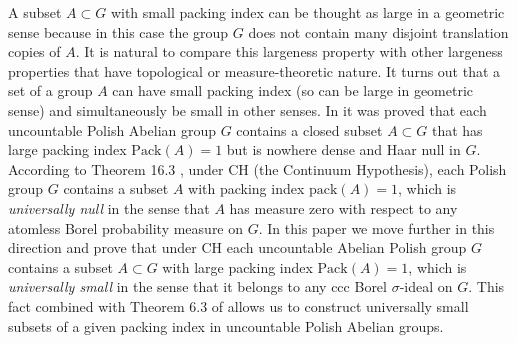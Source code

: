 \documentclass[11pt]{amsart}
\begin{document}
A subset $A\subset G$ with small packing index can be thought as large in a geometric sense because in this case the group $G$ does not contain many disjoint translation copies of $A$. It is natural to compare this largeness property with other largeness properties that have topological or measure-theoretic nature. It turns out that a set of a group $A$ can have small packing index (so can be large in geometric sense) and simultaneously be small in other senses. In \cite{BLR} it was proved that each uncountable Polish Abelian group $G$ contains a closed subset $A\subset G$ that has large packing index ${\mathrm{Pack}}(A)=1$ but is nowhere dense and Haar null in $G$. According to Theorem 16.3 \cite{PB}, under CH (the Continuum Hypothesis), each Polish group $G$ contains a subset $A$ with packing index ${\mathrm{pack}}(A)=1$, which is {\em universally null} in the sense that $A$ has measure zero with respect to any atomless Borel probability measure on $G$. In this paper we move further in this direction and prove that under CH each uncountable Abelian Polish group $G$ contains a subset $A\subset G$ with large packing index ${\mathrm{Pack}}(A)=1$, which is {\em universally small} in the sense that it belongs to any ccc Borel $\sigma$-ideal on $G$. This fact combined with Theorem 6.3 of \cite{BLR} allows us to construct universally small subsets of a given packing index in uncountable Polish Abelian groups.
\end{document}

